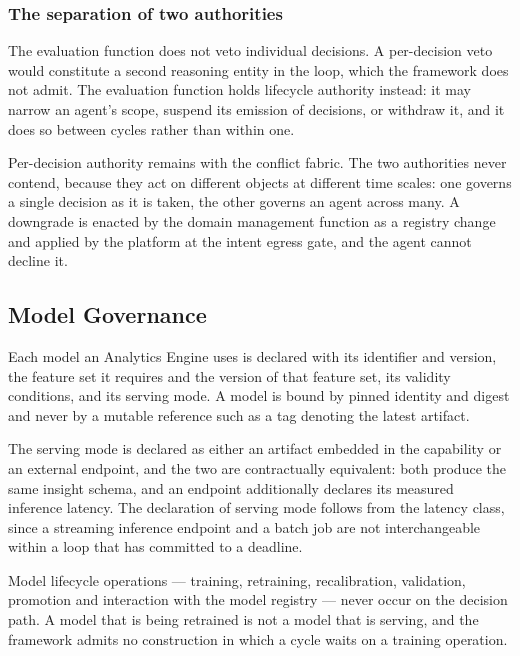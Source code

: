 \hypertarget{the-separation-of-two-authorities}{%
\subsubsection{The separation of two authorities}\label{the-separation-of-two-authorities}}

The evaluation function does not veto individual decisions. A
per-decision veto would constitute a second reasoning entity in the
loop, which the framework does not admit. The evaluation function holds
lifecycle authority instead: it may narrow an agent's scope, suspend its
emission of decisions, or withdraw it, and it does so between cycles
rather than within one.

Per-decision authority remains with the conflict fabric. The two
authorities never contend, because they act on different objects at
different time scales: one governs a single decision as it is taken, the
other governs an agent across many. A downgrade is enacted by the domain
management function as a registry change and applied by the platform at
the intent egress gate, and the agent cannot decline it.

\hypertarget{model-governance}{%
\subsection{Model Governance}\label{model-governance}}

Each model an Analytics Engine uses is declared with its identifier and
version, the feature set it requires and the version of that feature
set, its validity conditions, and its serving mode. A model is bound by
pinned identity and digest and never by a mutable reference such as a
tag denoting the latest artifact.

The serving mode is declared as either an artifact embedded in the
capability or an external endpoint, and the two are contractually
equivalent: both produce the same insight schema, and an endpoint
additionally declares its measured inference latency. The declaration of
serving mode follows from the latency class, since a streaming inference
endpoint and a batch job are not interchangeable within a loop that has
committed to a deadline.

Model lifecycle operations --- training, retraining, recalibration,
validation, promotion and interaction with the model registry --- never
occur on the decision path. A model that is being retrained is not a
model that is serving, and the framework admits no construction in which
a cycle waits on a training operation.


